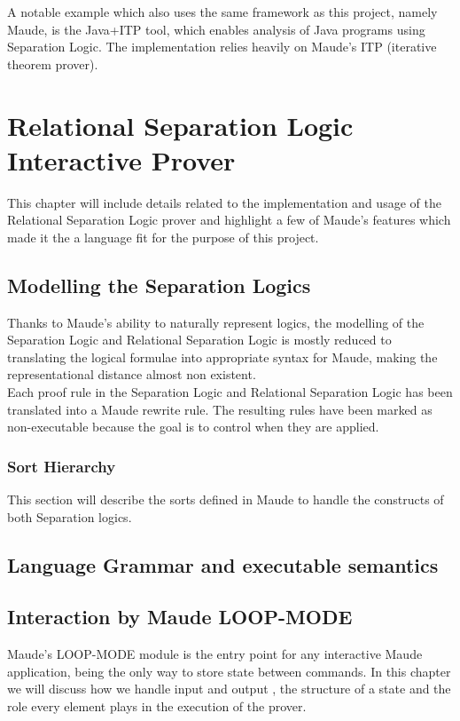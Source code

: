 \documentclass[12pt,a4paper]{article}
\begin{document}
A notable example which also uses the same framework as this project, namely Maude, is the Java+ITP\cite{JAVAITP} tool, which enables analysis of Java programs using Separation Logic. The implementation relies heavily on Maude's ITP (iterative theorem prover).

\section{Relational Separation Logic Interactive Prover} 
This chapter will include details related to the implementation and usage of the Relational Separation Logic prover and highlight a few of Maude's features which made it the a language fit for the purpose of this project.
\subsection{Modelling the Separation Logics}
Thanks to Maude's ability to naturally represent logics, the modelling of the Separation Logic and Relational Separation Logic is mostly reduced to translating the logical formulae into appropriate syntax for Maude, making the representational distance \cite{maudeprimer} almost non existent. \\

Each proof rule in the Separation Logic and Relational Separation Logic has been translated into a Maude rewrite rule. The resulting rules have been marked as non-executable because the goal is to control when they are applied.

\subsubsection{Sort Hierarchy}
This section will describe the sorts defined in Maude to handle the constructs of both Separation logics.
\subsection{Language Grammar and executable semantics}
\subsection{Interaction by Maude LOOP-MODE}
Maude's LOOP-MODE module is the entry point for any interactive Maude application, being the only way to store state between commands. In this chapter we will discuss how we handle input and output , the structure of a state and the role every element plays in the execution of the prover.\\
\end{document}
